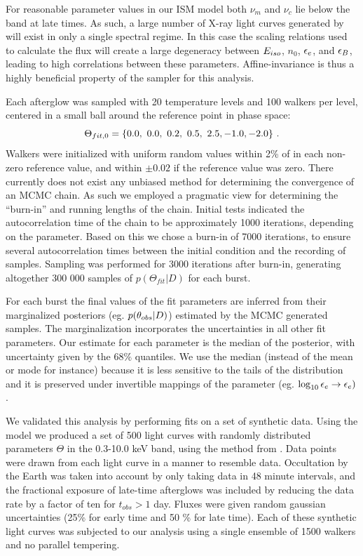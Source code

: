 For reasonable parameter values in our ISM model both $\nu_m$ and $\nu_c$ lie below the \swiftXRT{} band at late times.  As such, a large number of X-ray light curves generated by \scalefit{} will exist in only a single spectral regime.  In this case the scaling relations used to calculate the flux will create a large degeneracy between $E_{iso}$, $n_0$, $\epsilon_e$, and $\epsilon_B$, leading to high correlations between these parameters.  Affine-invariance is thus a highly beneficial property of the sampler for this analysis.

Each afterglow was sampled with 20 temperature levels and 100 walkers per level, centered in a small ball around the reference point in phase space:
\begin{equation}\eqlabel{init}
	\Theta_{fit, 0} = \{0.0, \ 0.0,\  0.2, \ 0.5,\  2.5, -1.0, -2.0\} \ .
\end{equation}
Walkers were initialized with uniform random values within 2\% of  in each non-zero reference value, and within $\pm 0.02$ if the reference value was zero.  There currently does not exist any unbiased method for determining the convergence of an MCMC chain.  As such we employed a pragmatic view for determining the ``burn-in'' and running lengths of the chain.  Initial tests indicated the autocorrelation time of the chain to be approximately 1000 iterations, depending on the parameter.  Based on this we chose a burn-in of 7000 iterations, to ensure several autocorrelation times between the initial condition and the recording of samples.  Sampling was performed for 3000 iterations after burn-in, generating altogether 300 000 samples of $p(\Theta_{fit} | D)$ for each burst.

For each burst the final values of the fit parameters are inferred from their marginalized posteriors (eg. $p(\theta_{obs} |D)$) estimated by the MCMC generated samples.  The marginalization incorporates the uncertainties in all other fit parameters.  Our estimate for each parameter is the median of the posterior, with uncertainty given by the $68\%$ quantiles.  We use the median (instead of the mean or mode for instance) because it is less sensitive to the tails of the distribution and it is preserved under invertible mappings of the parameter (eg. $\log_{10} \epsilon_e \to \epsilon_e)$.

	
We validated this analysis by performing fits on a set of synthetic data.  Using the \scalefit{} model we produced a set of 500 light curves with randomly distributed parameters $\Theta$ in the \swiftXRT{} 0.3-10.0 keV band, using the method from \citet{vanEer11}.  Data points were drawn from each light curve in a manner to resemble \swiftXRT{} data.  Occultation by the Earth was taken into account by only taking data in 48 minute intervals, and the fractional exposure of late-time afterglows was included by reducing the data rate by a factor of ten for $t_{obs} > 1$ day.  Fluxes were given random gaussian uncertainties (25\% for early time and 50 \% for late time).  Each of these synthetic light curves was subjected to our analysis using a single ensemble of 1500 walkers and no parallel tempering.    

